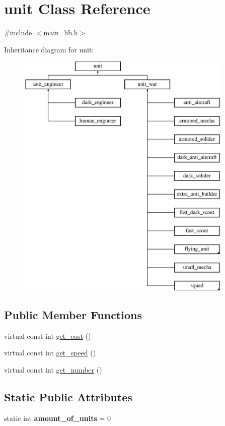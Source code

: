 \hypertarget{classunit}{}\section{unit Class Reference}
\label{classunit}


{\ttfamily \#include $<$main\+\_\+lib.\+h$>$}

Inheritance diagram for unit\+:\begin{figure}[H]
\begin{center}
\leavevmode
\includegraphics[height=12.000000cm]{classunit}
\end{center}
\end{figure}
\subsection*{Public Member Functions}
\begin{DoxyCompactItemize}
\item 
virtual const int \mbox{\hyperlink{classunit_a817ef860467c21c378deb39f738c33e0}{get\+\_\+cost}} ()
\item 
virtual const int \mbox{\hyperlink{classunit_af81d18961574843ddaa5273bfb57cf7f}{get\+\_\+speed}} ()
\item 
virtual const int \mbox{\hyperlink{classunit_ab417b46197e2490f7fe279a9219e0f3c}{get\+\_\+number}} ()
\end{DoxyCompactItemize}
\subsection*{Static Public Attributes}
\begin{DoxyCompactItemize}
\item 
\mbox{\label{classunit_a31777e05331f1b9253a487820eaf5e3c}} 
static int {\bfseries amount\+\_\+of\+\_\+units} = 0
\end{DoxyCompactItemize}
